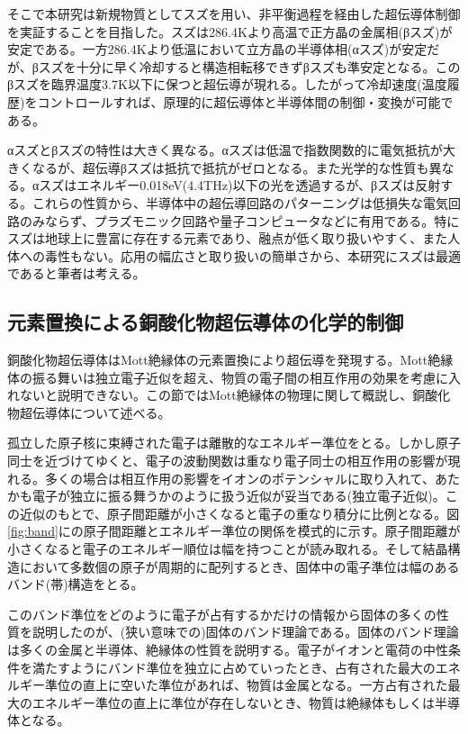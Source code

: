 そこで本研究は新規物質としてスズを用い、非平衡過程を経由した超伝導体制御を実証することを目指した。スズは286.4Kより高温で正方晶の金属相(βスズ)が安定である。一方286.4Kより低温において立方晶の半導体相(αスズ)が安定だが、βスズを十分に早く冷却すると構造相転移できずβスズも準安定となる。このβスズを臨界温度3.7K以下に保つと超伝導が現れる。したがって冷却速度(温度履歴)をコントロールすれば、原理的に超伝導体と半導体間の制御・変換が可能である。

αスズとβスズの特性は大きく異なる。αスズは低温で指数関数的に電気抵抗が大きくなるが、超伝導βスズは抵抗で抵抗がゼロとなる。また光学的な性質も異なる。αスズはエネルギー0.018eV(4.4THz)以下の光を透過するが、βスズは反射する。これらの性質から、半導体中の超伝導回路のパターニングは低損失な電気回路のみならず、プラズモニック回路や量子コンピュータなどに有用である。特にスズは地球上に豊富に存在する元素であり、融点が低く取り扱いやすく、また人体への毒性もない。応用の幅広さと取り扱いの簡単さから、本研究にスズは最適であると筆者は考える。

\subsection{元素置換による銅酸化物超伝導体の化学的制御}
銅酸化物超伝導体はMott絶縁体の元素置換により超伝導を発現する\cite{Lee2006}。Mott絶縁体の振る舞いは独立電子近似を超え、物質の電子間の相互作用の効果を考慮に入れないと説明できない。この節ではMott絶縁体の物理に関して概説し、銅酸化物超伝導体について述べる。

孤立した原子核に束縛された電子は離散的なエネルギー準位をとる。しかし原子同士を近づけてゆくと、電子の波動関数は重なり電子同士の相互作用の影響が現れる。多くの場合は相互作用の影響をイオンのポテンシャルに取り入れて、あたかも電子が独立に振る舞うかのように扱う近似が妥当である(独立電子近似)\cite{ashcroft1976}。この近似のもとで、原子間距離が小さくなると電子の重なり積分に比例となる。図\ref{fig:band}にの原子間距離とエネルギー準位の関係を模式的に示す。原子間距離が小さくなると電子のエネルギー順位は幅を持つことが読み取れる。そして結晶構造において多数個の原子が周期的に配列するとき、固体中の電子準位は幅のあるバンド(帯)構造をとる。

このバンド準位をどのように電子が占有するかだけの情報から固体の多くの性質を説明したのが、(狭い意味での)固体のバンド理論である。固体のバンド理論は多くの金属と半導体、絶縁体の性質を説明する。電子がイオンと電荷の中性条件を満たすようにバンド準位を独立に占めていったとき、占有された最大のエネルギー準位の直上に空いた準位があれば、物質は金属となる。一方占有された最大のエネルギー準位の直上に準位が存在しないとき、物質は絶縁体もしくは半導体となる。

